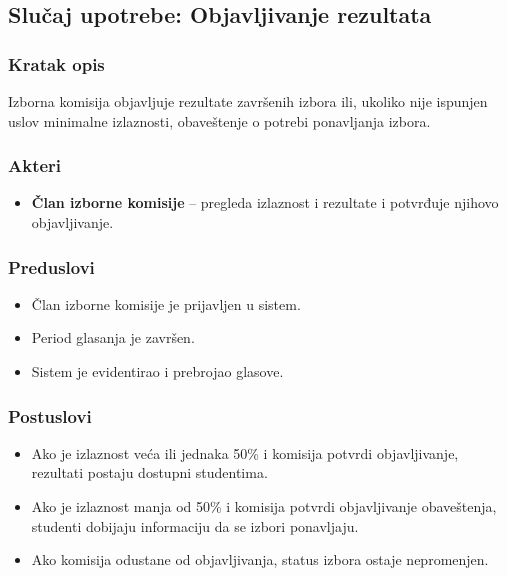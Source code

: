 \subsection{Slučaj upotrebe: Objavljivanje rezultata}

\subsubsection*{Kratak opis}
Izborna komisija objavljuje rezultate završenih izbora ili, ukoliko nije ispunjen uslov minimalne izlaznosti, obaveštenje o potrebi ponavljanja izbora.

\subsubsection*{Akteri}
\begin{itemize}
    \item \textbf{Član izborne komisije} -- pregleda izlaznost i rezultate i potvrđuje njihovo objavljivanje.
\end{itemize}

\subsubsection*{Preduslovi}
\begin{itemize}
    \item Član izborne komisije je prijavljen u sistem.
    \item Period glasanja je završen.
    \item Sistem je evidentirao i prebrojao glasove.
\end{itemize}

\subsubsection*{Postuslovi}
\begin{itemize}
    \item Ako je izlaznost veća ili jednaka 50\% i komisija potvrdi objavljivanje, rezultati postaju dostupni studentima.
    \item Ako je izlaznost manja od 50\% i komisija potvrdi objavljivanje obaveštenja, studenti dobijaju informaciju da se izbori ponavljaju.
    \item Ako komisija odustane od objavljivanja, status izbora ostaje nepromenjen.
\end{itemize}

